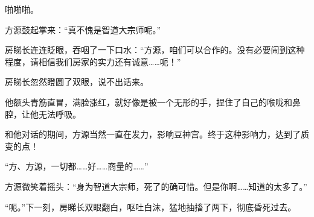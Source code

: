 \begin{this_body}
啪啪啪。

方源鼓起掌来：“真不愧是智道大宗师呢。”

房睇长连连眨眼，吞咽了一下口水：“方源，咱们可以合作的。没有必要闹到这种程度，请相信我们房家的实力还有诚意……呃！”

房睇长忽然瞪圆了双眼，说不出话来。

他额头青筋直冒，满脸涨红，就好像是被一个无形的手，捏住了自己的喉咙和鼻腔，让他无法呼吸。

和他对话的期间，方源当然一直在发力，影响豆神宫。终于这种影响力，达到了质变的点！

“方、方源，一切都……好……商量的……”

方源微笑着摇头：“身为智道大宗师，死了的确可惜。但是你啊……知道的太多了。”

“呃。”下一刻，房睇长双眼翻白，呕吐白沫，猛地抽搐了两下，彻底昏死过去。

\end{this_body}

